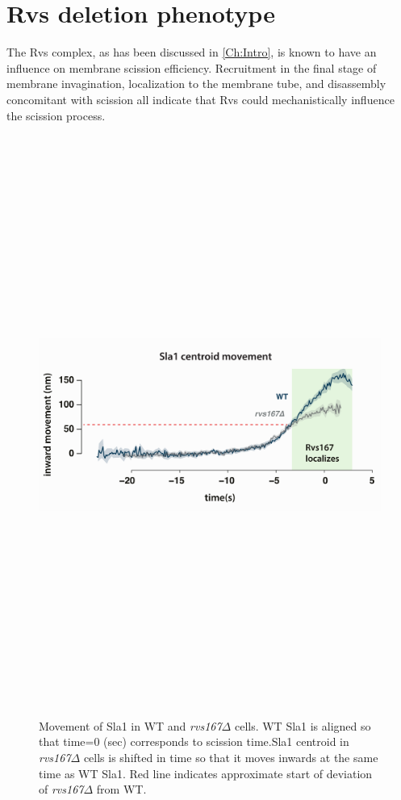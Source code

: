 

\section{Rvs deletion phenotype}
\label{sec:rvsdel}

The Rvs complex, as has been discussed in \ref{Ch:Intro}, is known to have an influence on membrane scission efficiency. Recruitment in the final stage of membrane invagination, localization to the membrane tube, and disassembly concomitant with scission all indicate that Rvs could mechanistically influence the scission process.

	\vspace{2mm}
	
	\begin{figure}[H]
		\centering
		\includegraphics[width=14cm,height=19cm, keepaspectratio, valign=t]{figures/results_final/rvsdeletion3}
		\caption[Coat movement in \textit{rvs167$\Delta$} cells]
		{Movement of Sla1 in WT and  \textit{rvs167$\Delta$} cells. WT Sla1 is aligned so that time=0 (sec) corresponds to scission time.Sla1 centroid  in \textit{rvs167$\Delta$} cells is shifted in time so that it moves inwards at the same time as WT Sla1. Red line indicates approximate start of deviation of \textit{rvs167$\Delta$} from WT. 
			\label{fig2_rvsdelta}
		}
	\end{figure}



